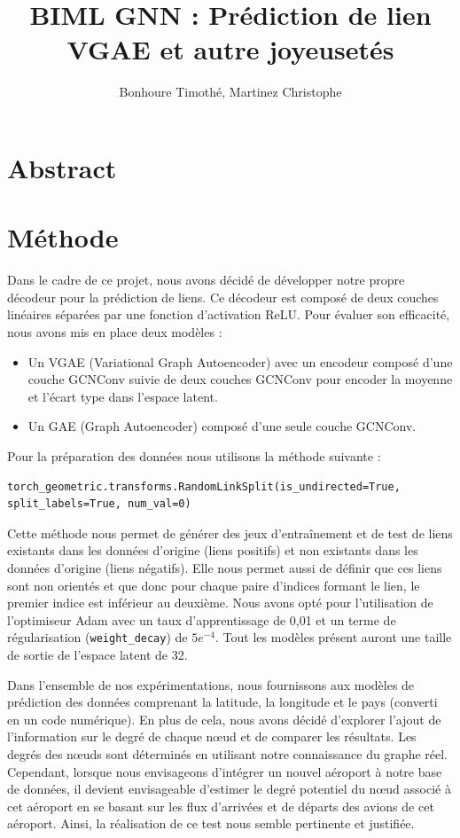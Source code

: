 \documentclass{article}
\begin{document}
\title{BIML GNN : Prédiction de lien \\
\footnotesize{VGAE et autre joyeusetés}}
\author{Bonhoure Timothé, Martinez Christophe}                      %

\maketitle
\tableofcontents
\section*{Abstract}
\newpage

\section{Méthode}

Dans le cadre de ce projet, nous avons décidé de développer notre propre décodeur pour la prédiction de liens. Ce décodeur est composé de deux couches linéaires séparées par une fonction d'activation ReLU. Pour évaluer son efficacité, nous avons mis en place deux modèles :
\begin{itemize}
    \item Un VGAE (Variational Graph Autoencoder) avec un encodeur composé d'une couche GCNConv suivie de deux couches GCNConv pour encoder la moyenne et l'écart type dans l'espace latent.
    \item Un GAE (Graph Autoencoder) composé d'une seule couche GCNConv.
\end{itemize}
Pour la préparation des données nous utilisons la méthode suivante :
\begin{verbatim}
torch_geometric.transforms.RandomLinkSplit(is_undirected=True, split_labels=True, num_val=0)
\end{verbatim}
Cette méthode nous permet de générer des jeux d’entraînement et de test de liens existants dans les données d'origine (liens positifs) et non existants dans les données d'origine (liens négatifs). Elle nous permet aussi de définir que ces liens sont non orientés et que donc pour chaque paire d’indices formant le lien, le premier indice est inférieur au deuxième.
Nous avons opté pour l'utilisation de l'optimiseur Adam avec un taux d'apprentissage de 0,01 et un terme de régularisation (\texttt{weight\_decay}) de \(5e^{-4}\).
Tout les modèles présent auront une taille de sortie de l'espace latent de 32.

Dans l'ensemble de nos expérimentations, nous fournissons aux modèles de prédiction des données comprenant la latitude, la longitude et le pays (converti en un code numérique). En plus de cela, nous avons décidé d'explorer l'ajout de l'information sur le degré de chaque nœud et de comparer les résultats.
Les degrés des nœuds sont déterminés en utilisant notre connaissance du graphe réel. Cependant, lorsque nous envisageons d'intégrer un nouvel aéroport à notre base de données, il devient envisageable d'estimer le degré potentiel du nœud associé à cet aéroport en se basant sur les flux d'arrivées et de départs des avions de cet aéroport. Ainsi, la réalisation de ce test nous semble pertinente et justifiée.
\end{document}
